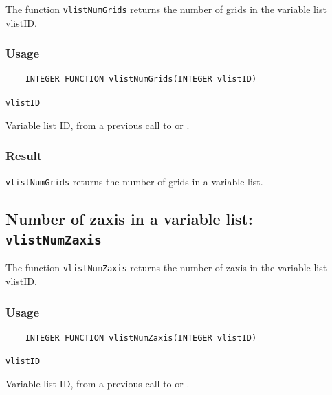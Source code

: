 The function {\texttt{vlistNumGrids}} returns the number of grids in the variable list vlistID.

\subsubsection*{Usage}

\begin{verbatim}
    INTEGER FUNCTION vlistNumGrids(INTEGER vlistID)
\end{verbatim}

\hspace*{4mm}\begin{minipage}[]{15cm}
\begin{deflist}{\texttt{vlistID}\ }
\item[\texttt{vlistID}]
Variable list ID, from a previous call to {} or {}.

\end{deflist}
\end{minipage}

\subsubsection*{Result}

{\texttt{vlistNumGrids}} returns the number of grids in a variable list.



\subsection{Number of zaxis in a variable list: \texttt{vlistNumZaxis}}
\label{vlistNumZaxis}

The function {\texttt{vlistNumZaxis}} returns the number of zaxis in the variable list vlistID.

\subsubsection*{Usage}

\begin{verbatim}
    INTEGER FUNCTION vlistNumZaxis(INTEGER vlistID)
\end{verbatim}

\hspace*{4mm}\begin{minipage}[]{15cm}
\begin{deflist}{\texttt{vlistID}\ }
\item[\texttt{vlistID}]
Variable list ID, from a previous call to {} or {}.

\end{deflist}
\end{minipage}

